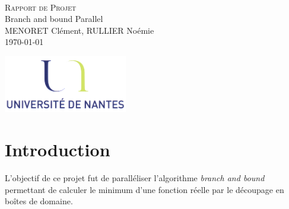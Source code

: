 \documentclass[a4paper,10pt]{article}
\begin{document}
\fancyhead[LE,CE,RE,LO,CO,RO]{}
\fancyfoot[LE,CE,RE,LO,CO,RO]{}
\renewcommand{\headrulewidth}{0.4pt}
\renewcommand{\footrulewidth}{0.4pt}

\begin{titlepage}

\vspace*{\fill}~
\begin{center}
{\large \textsc{Rapport de Projet}} \\
\vspace{1cm}
{\LARGE Branch and bound Parallel} \\
\vspace{1cm}
MENORET Clément, RULLIER Noémie \\
\today
\end{center}
\vspace*{\fill}

\begin{center}
\noindent 
\includegraphics[height=2.5cm]{Images/universite.png}
\end{center}
\pagebreak
\end{titlepage}

\newpage
\tableofcontents  

\newpage
\pagestyle{fancy}

\section{Introduction}
L'objectif de ce projet fut de paralléliser l'algorithme \emph{branch and bound} permettant de calculer le minimum d'une fonction réelle par le découpage en boîtes de domaine.
\end{document}
